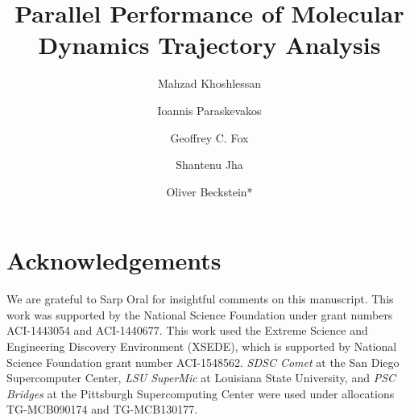 \documentclass[LATO1COL]{WileyNJD-v2}
\begin{document}
\title{Parallel Performance of Molecular Dynamics Trajectory Analysis}

\author[1]{Mahzad Khoshlessan}
\author[2]{Ioannis Paraskevakos}
\author[3]{Geoffrey C. Fox}
\author[2]{Shantenu Jha}
\author[1,4]{Oliver Beckstein*}


\address[1]{, ,
  , }
\address[2]{,
  , , }
\address[3]{, ,
  , }
\address[4]{, ,
  , }

    



\maketitle














\section*{Acknowledgements}
\label{acknowledgements}
\ack



We are grateful to Sarp Oral for insightful comments on this manuscript.
This work was supported by the National Science Foundation under grant numbers ACI-1443054 and ACI-1440677.
This work used the Extreme Science and Engineering Discovery Environment (XSEDE), which is supported by National Science Foundation grant number ACI-1548562.
\emph{SDSC Comet} at the San Diego Supercomputer Center, \emph{LSU SuperMic} at Louisiana State University, and \emph{PSC Bridges} at the Pittsburgh Supercomputing Center were used under allocations TG-MCB090174 and TG-MCB130177.




\clearpage

\appendix



\end{document}
